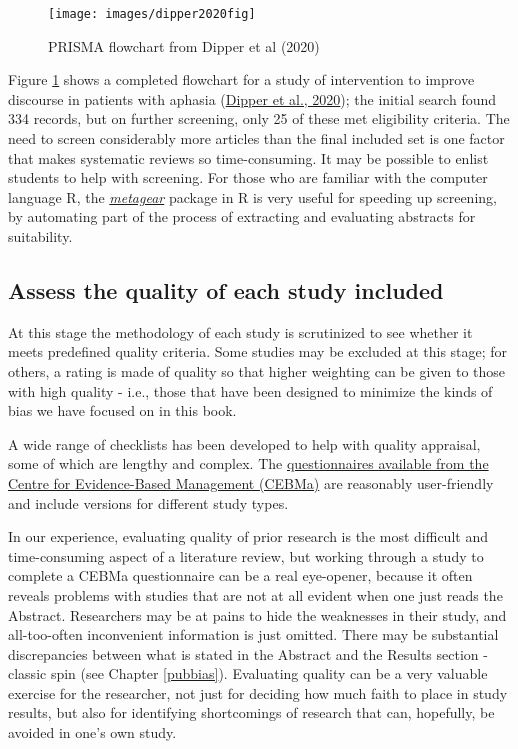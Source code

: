 \documentclass{krantz}
\begin{document}
\begin{figure}

{\centering \texttt{[image: images/dipper2020fig]} 

}

\caption{PRISMA flowchart from Dipper et al (2020)}\label{fig:prismachart}
\end{figure}

Figure \ref{fig:prismachart} shows a completed flowchart for a study of intervention to improve discourse in patients with aphasia (\protect\hyperlink{ref-dipper2020}{Dipper et al., 2020}); the initial search found 334 records, but on further screening, only 25 of these met eligibility criteria. The need to screen considerably more articles than the final included set is one factor that makes systematic reviews so time-consuming. It may be possible to enlist students to help with screening. For those who are familiar with the computer language R, the \href{https://github.com/mjlajeunesse/}{\emph{metagear}} package in R is very useful for speeding up screening, by automating part of the process of extracting and evaluating abstracts for suitability.

\hypertarget{assess-the-quality-of-each-study-included}{%
\subsection{Assess the quality of each study included}\label{assess-the-quality-of-each-study-included}}

At this stage the methodology of each study is scrutinized to see whether it meets predefined quality criteria. Some studies may be excluded at this stage; for others, a rating is made of quality so that higher weighting can be given to those with high quality - i.e., those that have been designed to minimize the kinds of bias we have focused on in this book.

A wide range of checklists has been developed to help with quality appraisal, some of which are lengthy and complex. The \href{https://cebma.org/resources-and-tools/what-is-critical-appraisal/}{questionnaires available from the Centre for Evidence-Based Management (CEBMa)} are reasonably user-friendly and include versions for different study types.

In our experience, evaluating quality of prior research is the most difficult and time-consuming aspect of a literature review, but working through a study to complete a CEBMa questionnaire can be a real eye-opener, because it often reveals problems with studies that are not at all evident when one just reads the Abstract. Researchers may be at pains to hide the weaknesses in their study, and all-too-often inconvenient information is just omitted. There may be substantial discrepancies between what is stated in the Abstract and the Results section - classic spin (see Chapter \ref{pubbias}). Evaluating quality can be a very valuable exercise for the researcher, not just for deciding how much faith to place in study results, but also for identifying shortcomings of research that can, hopefully, be avoided in one's own study.
\end{document}

